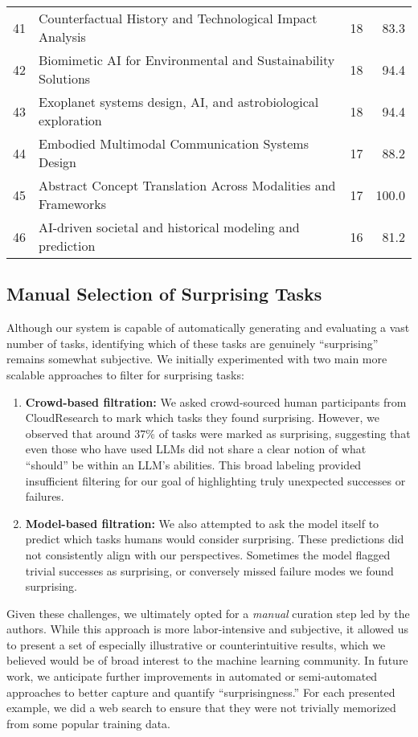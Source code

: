 \begin{table}[h!]
{\begin{tabular}{r l r r}
41 & Counterfactual History and Technological Impact Analysis & 18 & 83.3 \\
42 & Biomimetic AI for Environmental and Sustainability Solutions & 18 & 94.4 \\
43 & Exoplanet systems design, AI, and astrobiological exploration & 18 & 94.4 \\
44 & Embodied Multimodal Communication Systems Design & 17 & 88.2 \\
45 & Abstract Concept Translation Across Modalities and Frameworks & 17 & 100.0 \\
46 & AI-driven societal and historical modeling and prediction & 16 & 81.2 \\
\bottomrule
\end{tabular}}
\end{table}

\clearpage

\subsection{Manual Selection of Surprising Tasks}
\label{appsubsec:manual_selection}

Although our system is capable of automatically generating and evaluating a vast number of tasks, identifying which of these tasks are genuinely ``surprising'' remains somewhat subjective. 
We initially experimented with two main more scalable approaches to filter for surprising tasks:
\begin{enumerate}
\item \textbf{Crowd-based filtration:} We asked crowd-sourced human participants from CloudResearch to mark which tasks they found surprising. However, we observed that around 37\% of tasks were marked as surprising, suggesting that even those who have used LLMs did not share a clear notion of what ``should'' be within an LLM's abilities. This broad labeling provided insufficient filtering for our goal of highlighting truly unexpected successes or failures.
\item \textbf{Model-based filtration:} We also attempted to ask the model itself to predict which tasks humans would consider surprising. These predictions did not consistently align with our perspectives. Sometimes the model flagged trivial successes as surprising, or conversely missed failure modes we found surprising.
\end{enumerate}

Given these challenges, we ultimately opted for a \emph{manual} curation step led by the authors.
While this approach is more labor-intensive and subjective, it allowed us to present a set of especially illustrative or counterintuitive results, which we believed would be of broad interest to the machine learning community.
In future work, we anticipate further improvements in automated or semi-automated approaches to better capture and quantify ``surprisingness.''
For each presented example, we did a web search to ensure that they were not trivially memorized from some popular training data.

